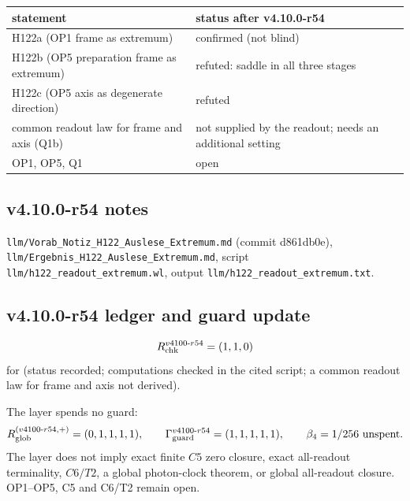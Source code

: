 \begin{center}
\small
\begin{tabular}{@{}>{\raggedright\arraybackslash}p{}>{\raggedright\arraybackslash}p{}@{}}
\toprule
statement & status after v4.10.0-r54\\
\midrule
H122a (OP1 frame as extremum) & confirmed (not blind)\\
H122b (OP5 preparation frame as extremum) & refuted: saddle in all three stages\\
H122c (OP5 axis as degenerate direction) & refuted\\
common readout law for frame and axis (Q1b) & not supplied by the readout; needs an additional setting\\
OP1, OP5, Q1 & open\\
\bottomrule
\end{tabular}
\end{center}

\subsection*{v4.10.0-r54 notes}
\label{subsec:v4100-r54-notes}

\texttt{llm/\allowbreak Vorab\_\allowbreak Notiz\_\allowbreak H122\_\allowbreak Auslese\_\allowbreak Extremum.md} (commit d861db0e),
\texttt{llm/\allowbreak Ergebnis\_\allowbreak H122\_\allowbreak Auslese\_\allowbreak Extremum.md}, script \texttt{llm/\allowbreak h122\_\allowbreak readout\_\allowbreak extremum.wl},
output \texttt{llm/\allowbreak h122\_\allowbreak readout\_\allowbreak extremum.txt}.

\subsection*{v4.10.0-r54 ledger and guard update}
\label{subsec:v4100-r54-ledger-guard}

\[
R_{\rm chk}^{v4100\text{-}r54}=(1,1,0)
\]
for (status recorded; computations checked in the cited script; a common readout law for frame and axis not derived).

The layer spends no guard:
\[
R_{\rm glob}^{(v4100\text{-}r54,+)}=(0,1,1,1,1),
\qquad
\Gamma_{\rm guard}^{v4100\text{-}r54}=(1,1,1,1,1),
\qquad
\beta_4=1/256\ \text{unspent}.
\]
The layer does not imply exact finite \(C5\) zero closure, exact all-readout terminality, \(C6/T2\), a global photon-clock theorem,
or global all-readout closure.  OP1--OP5, C5 and C6/T2 remain open.

